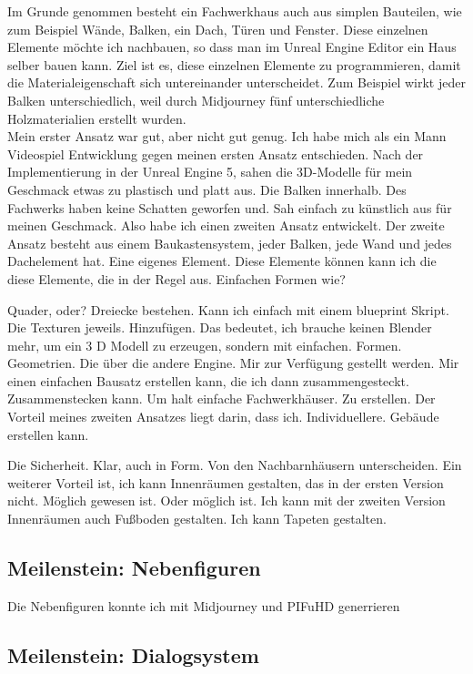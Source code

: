 \documentclass[12pt,a4paper,bibliography=totocnumbered,listof=totocnumbered]{scrartcl}
\begin{document}
Im Grunde genommen besteht ein Fachwerkhaus auch aus simplen Bauteilen, wie zum Beispiel Wände, Balken, ein Dach, Türen und Fenster. Diese einzelnen Elemente möchte ich nachbauen, so dass man im Unreal Engine Editor ein Haus selber bauen kann. 
Ziel ist es, diese einzelnen Elemente zu programmieren, damit die Materialeigenschaft sich untereinander unterscheidet. Zum Beispiel wirkt jeder Balken unterschiedlich, weil durch Midjourney fünf unterschiedliche Holzmaterialien erstellt wurden.
\\
Mein erster Ansatz war gut, aber nicht gut genug. Ich habe mich als ein Mann Videospiel Entwicklung gegen meinen ersten Ansatz entschieden. Nach der Implementierung in der Unreal Engine 5, sahen die 3D-Modelle für mein Geschmack etwas zu plastisch und platt aus. Die Balken innerhalb. Des Fachwerks haben keine Schatten geworfen und.  Sah einfach zu künstlich aus für meinen Geschmack. Also habe ich einen zweiten Ansatz entwickelt. Der zweite Ansatz besteht aus einem Baukastensystem, jeder Balken, jede Wand und jedes Dachelement hat.  Eine eigenes Element.  Diese Elemente können kann ich die diese Elemente, die in der Regel aus. Einfachen Formen wie?

Quader, oder?  	Dreiecke bestehen.  Kann ich einfach mit einem blueprint Skript.  Die Texturen jeweils. Hinzufügen.  Das bedeutet, ich brauche keinen Blender mehr, um ein 3 D Modell zu erzeugen, sondern mit einfachen.  Formen. Geometrien. Die über die andere Engine.   Mir zur Verfügung gestellt werden.  Mir einen einfachen Bausatz erstellen kann, die ich dann zusammengesteckt. Zusammenstecken kann. Um halt einfache Fachwerkhäuser. Zu erstellen.  Der Vorteil meines zweiten Ansatzes liegt darin, dass ich. Individuellere. Gebäude erstellen kann.

Die Sicherheit. Klar, auch in Form.  Von den Nachbarnhäusern unterscheiden.  	Ein weiterer Vorteil ist, ich kann Innenräumen gestalten, das in der ersten Version nicht. Möglich gewesen ist. Oder möglich ist.   	Ich kann mit der zweiten Version Innenräumen auch Fußboden gestalten. Ich kann Tapeten gestalten.

\subsection {Meilenstein: Nebenfiguren}
Die Nebenfiguren konnte ich mit Midjourney und PIFuHD generrieren
\subsection {Meilenstein: Dialogsystem}
\end{document}
